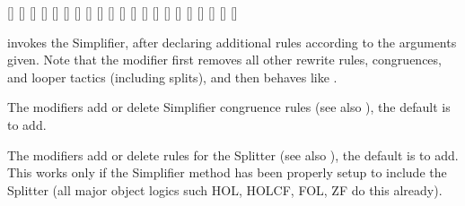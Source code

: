 \begin{isabellebody}
\begin{isamarkuptext}
  \begin{railoutput}
\rail@bar
{}[]
[]
\rail@endbar
\rail@bar
{}
[]
\rail@endbar
\rail@plus
{}
[]
\rail@endplus
\rail@end
{}
[]
\rail@bar
{}[]
[]
[]
[]
\rail@endbar
{}[]
\rail@end
{}
\rail@bar
{}[]
[]
[]
[]
\rail@bar
{}
[]
[]
\rail@endbar
{}
[]
\rail@bar
{}
[]
[]
\rail@endbar
\rail@endbar
{}[]
[]
\rail@end
\end{railoutput}


  \begin{description}

  \item \hyperlink{method.simp}{\mbox{}} invokes the Simplifier, after declaring
  additional rules according to the arguments given.  Note that the
   modifier first removes all other rewrite rules,
  congruences, and looper tactics (including splits), and then behaves
  like .

  \medskip The  modifiers add or delete Simplifier
  congruence rules (see also \cite{isabelle-ref}), the default is to
  add.

  \medskip The  modifiers add or delete rules for the
  Splitter (see also \cite{isabelle-ref}), the default is to add.
  This works only if the Simplifier method has been properly setup to
  include the Splitter (all major object logics such HOL, HOLCF, FOL,
  ZF do this already).


\end{description}
\end{isamarkuptext}
\end{isabellebody}
